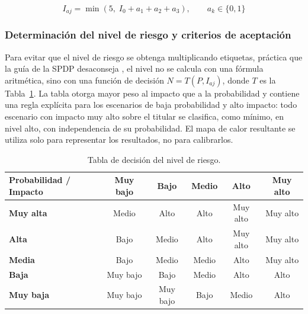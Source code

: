 \begin{equation}
\label{eq:impacto_ajustado}
I_{aj} = \min\left(5,\; I_0 + a_1 + a_2 + a_3\right), \qquad a_k \in \{0, 1\}
\end{equation}

\subsubsection{Determinación del nivel de riesgo y criterios de aceptación}

Para evitar que el nivel de riesgo se obtenga multiplicando etiquetas, práctica que la guía de la SPDP desaconseja \cite{spdp2026guiav2}, el nivel no se calcula con una fórmula aritmética, sino con una función de decisión $N = T(P, I_{aj})$, donde $T$ es la Tabla~\ref{tab:matriz_nivel}. La tabla otorga mayor peso al impacto que a la probabilidad y contiene una regla explícita para los escenarios de baja probabilidad y alto impacto: todo escenario con impacto muy alto sobre el titular se clasifica, como mínimo, en nivel alto, con independencia de su probabilidad. El mapa de calor resultante se utiliza solo para representar los resultados, no para calibrarlos.

\begin{table}[htbp]
  \centering
  \caption{Tabla de decisión del nivel de riesgo.}
  \label{tab:matriz_nivel}
  \small
  \renewcommand{\arraystretch}{1.35}
  \begin{tabular}{|l|c|c|c|c|c|}
    \hline
    \textbf{Probabilidad / Impacto} & \textbf{Muy bajo} & \textbf{Bajo} & \textbf{Medio} & \textbf{Alto} & \textbf{Muy alto} \\
    \hline
    \textbf{Muy alta} & Medio & Alto & Alto & Muy alto & Muy alto \\
    \hline
    \textbf{Alta}     & Bajo & Medio & Alto & Muy alto & Muy alto \\
    \hline
    \textbf{Media}    & Bajo & Medio & Medio & Alto & Muy alto \\
    \hline
    \textbf{Baja}     & Muy bajo & Bajo & Medio & Alto & Alto \\
    \hline
    \textbf{Muy baja} & Muy bajo & Muy bajo & Bajo & Medio & Alto \\
    \hline
  \end{tabular}
  \par\vspace{2pt}
  \raggedright
\end{table}

